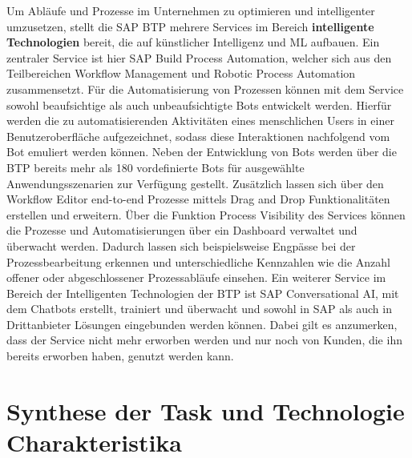 Um Abläufe und Prozesse im Unternehmen zu optimieren und intelligenter umzusetzen, stellt die SAP BTP mehrere Services im Bereich \textbf{intelligente Technologien} bereit, die auf künstlicher Intelligenz und ML aufbauen.  Ein zentraler Service ist hier SAP Build Process Automation, welcher sich aus den Teilbereichen Workflow Management und Robotic Process Automation zusammensetzt. Für die Automatisierung von Prozessen können mit dem Service sowohl beaufsichtige als auch unbeaufsichtigte Bots entwickelt werden. Hierfür werden die zu automatisierenden Aktivitäten eines menschlichen Users in einer Benutzeroberfläche aufgezeichnet, sodass diese Interaktionen nachfolgend vom Bot emuliert werden können. Neben der Entwicklung von Bots werden über die BTP bereits mehr als 180 vordefinierte Bots für ausgewählte Anwendungsszenarien zur Verfügung gestellt. \autocite[Vgl.][S. 74-76]{SEUBERT} Zusätzlich lassen sich über den Workflow Editor end-to-end Prozesse mittels Drag and Drop Funktionalitäten erstellen und erweitern. Über die Funktion Process Visibility des Services können die Prozesse und Automatisierungen über ein Dashboard verwaltet und überwacht werden. Dadurch lassen sich beispielsweise Engpässe bei der Prozessbearbeitung erkennen und unterschiedliche Kennzahlen wie die Anzahl offener oder abgeschlossener Prozessabläufe einsehen. \autocite[Vgl.][S. 5]{FSDBPA}
Ein weiterer Service im Bereich der Intelligenten Technologien der BTP ist SAP Conversational AI, mit dem Chatbots erstellt, trainiert und überwacht und sowohl in SAP als auch in Drittanbieter Lösungen eingebunden werden können. Dabei gilt es anzumerken, dass der Service nicht mehr erworben werden und nur noch von Kunden, die ihn bereits erworben haben, genutzt werden kann. \autocite[Vgl.][]{CONVERSATIONALFSD2021}




\section{Synthese der Task und Technologie Charakteristika}

